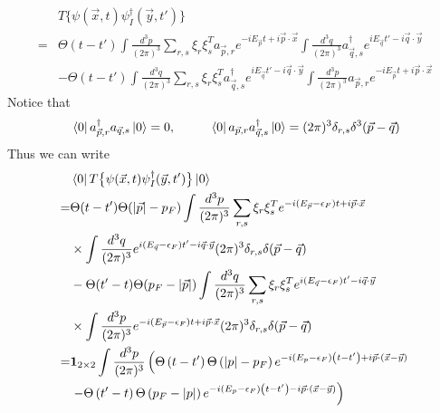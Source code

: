 \documentclass[12pt]{article}
\begin{document}
\begin{equation*}
    \begin{split}
        &T\big\{\psi(\vec{x},t)\psi^\dagger_I(\vec{y},t')\big\}\\
        =&\Theta(t-t')\int\frac{d^3p}{(2\pi)^3}\sum_{r,s}\xi_r\xi^T_sa_{\vec{p},
        r}e^{-iE_{\vec{p}}t+i\vec{p}\cdot\vec{x}}\int\frac{d^3q}{(2\pi)^3}
        a^\dagger_{\vec{q},s}e^{iE_{\vec{q}}t'-i\vec{q}\cdot\vec{y}}\\
        &-\Theta(t-t')\int\frac{d^3q}{(2\pi)^3}\sum_{r,s}\xi_r\xi^T_s
        a^\dagger_{\vec{q},s}e^{iE_{\vec{q}}t'-i\vec{q}\cdot\vec{y}}
        \int\frac{d^3p}{(2\pi)^3}a_{\vec{p},r}e^{-iE_{\vec{p}}t+i\vec{p}\cdot
        \vec{x}}
    \end{split}
\end{equation*}
Notice that
\begin{equation*}
    \bra*{0}a^\dagger_{\vec{p},r}a_{\vec{q},s}\ket*{0}=0, \ \ \ \ \ \ \ \ 
    \bra*{0}a_{\vec{p},r}a^\dagger_{\vec{q},s}\ket*{0}=(2\pi)^3
    \delta_{r,s}\delta^3(\vec{p}-\vec{q})
\end{equation*}
Thus we can write
\begin{equation*}
    \begin{split}
        &\bra*{0}T\big\{\psi(\vec{x},t)\psi^\dagger_I(\vec{y},t')\big\}\ket*{0}\\
        =&\Theta(t-t')\Theta(|\vec{p}|-p_F)\int\frac{d^3p}{(2\pi)^3}\sum_{r,s}
        \xi_r\xi^T_se^{-i(E_{\vec{p}}-\epsilon_F)t+i\vec{p}\cdot\vec{x}}\\
        &\times\int\frac{d^3q}{(2\pi)^3}e^{i(E_{\vec{q}}-\epsilon_F)t'-i\vec{q}
        \cdot\vec{y}}(2\pi)^3\delta_{r,s}\delta(\vec{p}-\vec{q})\\
        &-\Theta(t'-t)\Theta(p_F-|\vec{p}|)\int\frac{d^3q}{(2\pi)^3}\sum_{r,s}
        \xi_r\xi^T_se^{i(E_{\vec{q}}-\epsilon_F)t'-i\vec{q}\cdot\vec{y}}\\
        &\times\int\frac{d^3p}{(2\pi)^3}e^{-i(E_{\vec{p}}-\epsilon_F)t+i\vec{p}
        \cdot\vec{x}}(2\pi)^3\delta_{r,s}\delta(\vec{p}-\vec{q})\\
        =&\mathbf{1}_{2 \times 2} \int \frac{d^{3} p}{(2 \pi)^{3}}\left(\Theta
        \left(t-t^{\prime}\right) \Theta\left(|p|-p_{F}\right) e^{-i\left(E_{p}
        -\epsilon_{F}\right)\left(t-t^{\prime}\right)+i \vec{p} \cdot(\vec{x}-
        \vec{y})}\right.\\
        &\left.-\Theta\left(t^{\prime}-t\right) \Theta\left(p_{F}-|p|\right)
        e^{-i\left(E_{p}-\epsilon_{F}\right)\left(t-t^{\prime}\right)-i\vec{p}
        \cdot(\vec{x}-\vec{y})}\right)
    \end{split}
\end{equation*}
\end{document}
